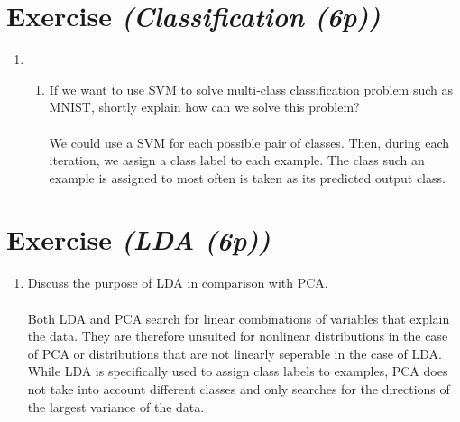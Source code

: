 \documentclass{article}
\begin{document}
\section{Exercise \textit{(Classification (6p))}}
\begin{enumerate}
    \item
        \begin{enumerate}
            \item If we want to use SVM to solve multi-class classification
                problem such as MNIST, shortly explain how can we solve this
                problem?\\
                \\
                We could use a SVM for each possible pair of classes. Then,
                during each iteration, we assign a class label to each example.
                The class such an example is assigned to most often is taken as
                its predicted output class.
        \end{enumerate}
\end{enumerate}

\section{Exercise \textit{(LDA (6p))}}
\begin{enumerate}
    \item
        Discuss the purpose of LDA in comparison with PCA.\\
        \\
        Both LDA and PCA search for linear combinations of variables that
        explain the data. They are therefore unsuited for nonlinear distributions
        in the case of PCA or distributions that are not linearly seperable in
        the case of LDA.
        While LDA is specifically used to assign class labels to examples, PCA
        does not take into account different classes and only searches for the
        directions of the largest variance of the data.
\end{enumerate}
\end{document}
